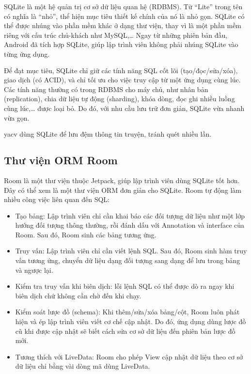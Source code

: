 \documentclass[../../thesis]{subfiles}
\begin{document}
SQLite là một hệ quản trị cơ sở dữ liệu quan hệ (RDBMS). Từ ``Lite'' trong tên
có nghĩa là ``nhỏ'', thể hiện mục tiêu thiết kế chính của nó là nhỏ gọn. SQLite
có thể được nhúng vào phần mềm khác ở dạng thư viện, thay vì là một phần mềm
riêng với cấu trúc chủ-khách như MySQL,\ldots{} Ngay từ những phiên bản đầu,
Android đã tích hợp SQLite, giúp lập trình viên không phải nhúng SQLite vào từng
ứng dụng.

Để đạt mục tiêu, SQLite chỉ giữ các tính năng SQL cốt lõi (tạo/đọc/sửa/xóa),
giao dịch (có ACID), và chỉ tối ưu cho việc truy cập từ một ứng dụng cùng lúc.
Các tính năng thường có trong RDBMS cho máy chủ, như nhân bản (replication),
chia dữ liệu tự động (sharding), khóa dòng, đọc ghi nhiều luồng cùng
lúc,\ldots{} được loại bỏ. Do đó, với nhu cầu lưu trữ đơn giản, SQLite vừa nhanh
vừa gọn.

yacv dùng SQLite để lưu đệm thông tin truyện, tránh quét nhiều lần.

\subsection{Thư viện ORM Room}

Room là một thư viện thuộc Jetpack, giúp lập trình viên dùng SQLite tốt hơn. Đây
có thể xem là một thư viện ORM đơn giản cho SQLite. Room tự động làm nhiều công
việc liên quan đến SQL:

\begin{itemize}
    \item
        Tạo bảng: Lập trình viên chỉ cần khai báo các đối tượng dữ liệu như một
        lớp hướng đối tượng thông thường, rồi đánh dấu với Annotation và
        interface của Room. Sau đó, Room sinh các bảng tương ứng.
    \item
        Truy vấn: Lập trình viên chỉ cần viết lệnh SQL. Sau đó, Room sinh hàm
        truy vấn tương ứng, chuyển dữ liệu dạng đối tượng sang dạng để lưu trong
        bảng và ngược lại.
    \item
        Kiểm tra truy vấn khi biên dịch: lỗi lệnh SQL có thể được dò ra ngay khi
        biên dịch chứ không cần chờ đến khi chạy.
    \item
        Kiểm soát lược đồ (schema): Khi thêm/sửa/xóa bảng/cột, Room luôn phát
        hiện và ép lập trình viên viết cơ chế cập nhật. Do đó, ứng dụng dùng
        lược đồ cũ khi được cập nhật sẽ biết cách sửa cơ sở dữ liệu đến phiên
        bản lược đồ mới.
    \item
        Tương thích với LiveData: Room cho phép View cập nhật dữ liệu theo cơ sở
        dữ liệu chỉ bằng vài dòng mã dùng LiveData.
\end{itemize}
\end{document}
